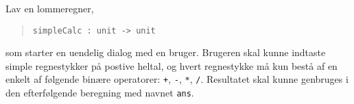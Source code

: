 Lav en lommeregner,
  \begin{quote}
    \mbox{\lstinline!simpleCalc : unit -> unit!}
  \end{quote}
  som starter en uendelig dialog med en bruger. Brugeren skal kunne indtaste simple regnestykker på postive heltal, og hvert regnestykke må kun bestå af en enkelt af følgende binære operatorer: \lstinline!+!, \lstinline!-!, \lstinline!*!, \lstinline!/!. Resultatet skal kunne genbruges i den efterfølgende beregning med navnet \lstinline!ans!.
